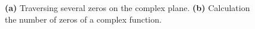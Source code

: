
\begin{figure}[tpb]
    \begin{minipage}[h]{0.5\linewidth}
    \end{minipage}
    \hfill
    \begin{minipage}[h]{0.46\linewidth}
    \end{minipage}
    \caption{\textbf{(a)} Traversing several zeros on the complex plane. \textbf{(b)} Calculation the number of zeros of a complex function.}
    \label{fig:couchy}
\end{figure}

